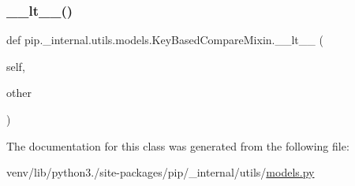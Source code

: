 \subsubsection{\texorpdfstring{\+\_\+\+\_\+lt\+\_\+\+\_\+()}{\_\_lt\_\_()}}
{\footnotesize\ttfamily def pip.\+\_\+internal.\+utils.\+models.\+Key\+Based\+Compare\+Mixin.\+\_\+\+\_\+lt\+\_\+\+\_\+ (\begin{DoxyParamCaption}\item[{}]{self,  }\item[{}]{other }\end{DoxyParamCaption})}



The documentation for this class was generated from the following file\+:\begin{DoxyCompactItemize}
\item 
venv/lib/python3./site-\/packages/pip/\+\_\+internal/utils/\hyperlink{__internal_2utils_2models_8py}{models.\+py}\end{DoxyCompactItemize}

